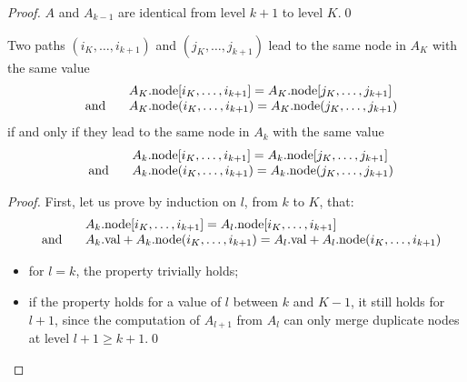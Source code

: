 \documentclass[a4paper,oneside,11pt,pdftex]{llncs}
\newcommand{\m}{\mbox}
\newcommand{\val}[1]{#1{\rm .val}}
\newcommand{\node}[1]{#1{\rm .node}}
\begin{document}
\begin{proof}
  $A$ and $A_{k-1}$ are identical from level $k+1$ to level $K$.\qed
\end{proof}

\begin{lemma}
  \label{lemma-n-k}
  Two paths $(i_K, \ldots, i_{k+1})$ and $(j_K, \ldots, j_{k+1})$ lead to the same node in $A_K$ with the same value
$$
\begin{array}{ll}
&\node{A_K}[i_K, \ldots, i_{k+1}] = \node{A_K}[j_K, \ldots, j_{k+1}]\\
\;\;\;\m{and}\;\;\;&
\node{A_K}(i_K, \ldots, i_{k+1}) = \node{A_K}(j_K, \ldots, j_{k+1})
\end{array}
$$
if and only if they lead to the same node in $A_k$ with the same value
$$
\begin{array}{ll}
&\node{A_k}[i_K, \ldots, i_{k+1}] = \node{A_k}[j_K, \ldots, j_{k+1}]\\
\;\;\;\m{and}\;\;\;&
\node{A_k}(i_K, \ldots, i_{k+1}) = \node{A_k}(j_K, \ldots, j_{k+1})
\end{array}
$$
\end{lemma}

\begin{proof}
  First, let us prove by induction on $l$, from $k$ to $K$, that:
$$
\begin{array}{ll}
&\node{A_k}[i_K, \ldots, i_{k+1}] = \node{A_l}[i_K, \ldots, i_{k+1}]\\
\;\;\;\m{and}\;\;\;&
\val{A_k}+\node{A_k}(i_K, \ldots, i_{k+1}) = \val{A_l}+\node{A_l}(i_K, \ldots, i_{k+1})
\end{array}
$$
  \begin{itemize}
  \item for $l = k$, the property trivially holds;
  \item if the property holds for a value of $l$ between $k$ and $K-1$, it still holds for $l+1$, since the computation of $A_{l+1}$ from $A_l$ can only merge duplicate nodes at level $l+1 \ge k+1$.\qed
  \end{itemize}
\end{proof}
\end{document}

